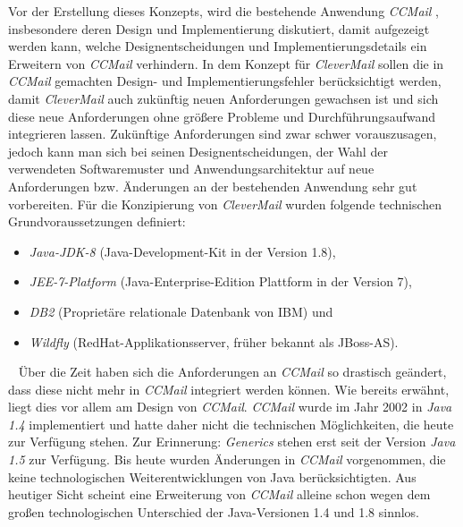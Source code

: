 \newline
\newline
Vor der Erstellung dieses Konzepts, wird die bestehende Anwendung \emph{CCMail} , insbesondere deren Design und Implementierung diskutiert, damit aufgezeigt werden kann, welche Designentscheidungen und Implementierungsdetails ein Erweitern von \emph{CCMail} verhindern. In dem Konzept für \emph{CleverMail} sollen die in \emph{CCMail} gemachten Design- und Implementierungsfehler berücksichtigt werden, damit \emph{CleverMail} auch zukünftig neuen Anforderungen gewachsen ist und sich diese neue Anforderungen ohne größere Probleme und Durchführungsaufwand integrieren lassen. Zukünftige Anforderungen sind zwar schwer vorauszusagen, jedoch kann man sich bei seinen Designentscheidungen, der Wahl der verwendeten Softwaremuster und Anwendungsarchitektur auf neue Anforderungen bzw. Änderungen an der bestehenden Anwendung sehr gut vorbereiten.
\newline
\newline
Für die Konzipierung von \emph{CleverMail} wurden folgende technischen Grundvoraussetzungen definiert:
\begin{itemize}
	\item \emph{Java-JDK-8} (Java-Development-Kit in der Version 1.8),
	\item \emph{JEE-7-Platform} (Java-Enterprise-Edition Plattform in der Version 7),
	\item \emph{DB2} (Proprietäre relationale Datenbank von IBM) und
	\item \emph{Wildfly} (RedHat-Applikationsserver, früher bekannt als JBoss-AS).
\end{itemize} 
\ \newline
Über die Zeit haben sich die Anforderungen an \emph{CCMail} so drastisch geändert, dass diese nicht mehr in \emph{CCMail} integriert werden können. Wie bereits erwähnt, liegt dies vor allem am Design von \emph{CCMail}. \emph{CCMail} wurde im Jahr 2002 in \emph{Java 1.4} implementiert und hatte daher nicht die technischen Möglichkeiten, die heute zur Verfügung stehen. Zur Erinnerung: \emph{Generics} stehen erst seit der Version \emph{Java 1.5} zur Verfügung. Bis heute wurden Änderungen in \emph{CCMail} vorgenommen, die keine technologischen Weiterentwicklungen von Java berücksichtigten. Aus heutiger Sicht scheint eine Erweiterung von \emph{CCMail} alleine schon wegen dem großen technologischen Unterschied der Java-Versionen 1.4 und 1.8 sinnlos.
\newline
\newline
